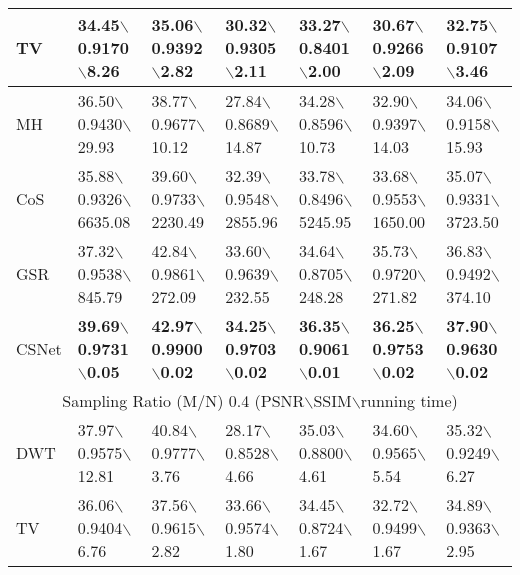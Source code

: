 \documentclass[5pt]{article}
\begin{document}
\begin{table*}[t]
\begin{tabular}{|l|l|l|l|l|l|l|}
\hline
TV & 34.45$\backslash$0.9170$\backslash$8.26 & 35.06$\backslash$0.9392$\backslash$2.82 & 30.32$\backslash$0.9305$\backslash$2.11 & 33.27$\backslash$0.8401$\backslash$2.00 & 30.67$\backslash$0.9266$\backslash$2.09 & 32.75$\backslash$0.9107$\backslash$3.46\\
\hline
MH & 36.50$\backslash$0.9430$\backslash$29.93 & 38.77$\backslash$0.9677$\backslash$10.12 & 27.84$\backslash$0.8689$\backslash$14.87 & 34.28$\backslash$0.8596$\backslash$10.73 & 32.90$\backslash$0.9397$\backslash$14.03 & 34.06$\backslash$0.9158$\backslash$15.93\\
\hline
CoS & 35.88$\backslash$0.9326$\backslash$\tiny 6635.08 & 39.60$\backslash$0.9733$\backslash$\tiny 2230.49 & 32.39$\backslash$0.9548$\backslash$\tiny 2855.96 & 33.78$\backslash$0.8496$\backslash$\tiny 5245.95 & 33.68$\backslash$0.9553$\backslash$\tiny 1650.00 & 35.07$\backslash$0.9331$\backslash$\tiny 3723.50\\
\hline
GSR & 37.32$\backslash$0.9538$\backslash$845.79 & 42.84$\backslash$0.9861$\backslash$272.09 & 33.60$\backslash$0.9639$\backslash$232.55 & 34.64$\backslash$0.8705$\backslash$248.28 & 35.73$\backslash$0.9720$\backslash$271.82 & 36.83$\backslash$0.9492$\backslash$374.10\\
\hline
CSNet & \textbf{39.69}$\backslash$\textbf{0.9731}$\backslash$\textbf{0.05} & \textbf{42.97}$\backslash$\textbf{0.9900}$\backslash$\textbf{0.02} & \textbf{34.25}$\backslash$\textbf{0.9703}$\backslash$\textbf{0.02} & \textbf{36.35}$\backslash$\textbf{0.9061}$\backslash$\textbf{0.01} & \textbf{36.25}$\backslash$\textbf{0.9753}$\backslash$\textbf{0.02} & \textbf{37.90}$\backslash$\textbf{0.9630}$\backslash$\textbf{0.02}\\
\hline
\multicolumn{7}{|c|}{Sampling Ratio (M/N) 0.4 (PSNR$\backslash$SSIM$\backslash$running time)}\\
\hline
DWT & 37.97$\backslash$0.9575$\backslash$12.81 & 40.84$\backslash$0.9777$\backslash$3.76 & 28.17$\backslash$0.8528$\backslash$4.66 & 35.03$\backslash$0.8800$\backslash$4.61 & 34.60$\backslash$0.9565$\backslash$5.54 & 35.32$\backslash$0.9249$\backslash$6.27\\
\hline
TV & 36.06$\backslash$0.9404$\backslash$6.76 & 37.56$\backslash$0.9615$\backslash$2.82 & 33.66$\backslash$0.9574$\backslash$1.80 & 34.45$\backslash$0.8724$\backslash$1.67 & 32.72$\backslash$0.9499$\backslash$1.67 & 34.89$\backslash$0.9363$\backslash$2.95\\

\end{tabular}
\end{table*}
\end{document}
